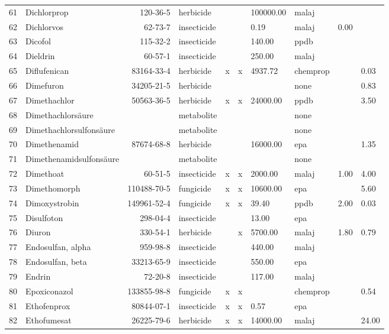 \begin{longtable}{lp{3cm}rlp{0.5cm}p{0.5cm}p{1cm}p{1cm}p{1cm}p{1cm}}
  61 & Dichlorprop & 120-36-5 & herbicide &  &  & 100000.00 & malaj &  &  \\ 
  62 & Dichlorvos & 62-73-7 & insecticide &  &  & 0.19 & malaj & 0.00 &  \\ 
  63 & Dicofol & 115-32-2 & insecticide &  &  & 140.00 & ppdb &  &  \\ 
  64 & Dieldrin & 60-57-1 & insecticide &  &  & 250.00 & malaj &  &  \\ 
  65 & Diflufenican & 83164-33-4 & herbicide & x & x & 4937.72 & chemprop &  & 0.03 \\ 
  66 & Dimefuron & 34205-21-5 & herbicide &  &  &  & none &  & 0.83 \\ 
  67 & Dimethachlor & 50563-36-5 & herbicide & x & x & 24000.00 & ppdb &  & 3.50 \\ 
  68 & Dimethachlorsäure &  & metabolite &  &  &  & none &  &  \\ 
  69 & Dimethachlorsulfonsäure &  & metabolite &  &  &  & none &  &  \\ 
  70 & Dimethenamid & 87674-68-8 & herbicide &  &  & 16000.00 & epa &  & 1.35 \\ 
  71 & Dimethenamidsulfonsäure &  & metabolite &  &  &  & none &  &  \\ 
  72 & Dimethoat & 60-51-5 & insecticide & x & x & 2000.00 & malaj & 1.00 & 4.00 \\ 
  73 & Dimethomorph & 110488-70-5 & fungicide & x & x & 10600.00 & epa &  & 5.60 \\ 
  74 & Dimoxystrobin & 149961-52-4 & fungicide & x & x & 39.40 & ppdb & 2.00 & 0.03 \\ 
  75 & Disulfoton & 298-04-4 & insecticide &  &  & 13.00 & epa &  &  \\ 
  76 & Diuron & 330-54-1 & herbicide &  & x & 5700.00 & malaj & 1.80 & 0.79 \\ 
  77 & Endosulfan, alpha & 959-98-8 & insecticide &  &  & 440.00 & malaj &  &  \\ 
  78 & Endosulfan, beta & 33213-65-9 & insecticide &  &  & 550.00 & epa &  &  \\ 
  79 & Endrin & 72-20-8 & insecticide &  &  & 117.00 & malaj &  &  \\ 
  80 & Epoxiconazol & 133855-98-8 & fungicide & x & x &  & chemprop &  & 0.54 \\ 
  81 & Ethofenprox & 80844-07-1 & insecticide & x & x & 0.57 & epa &  &  \\ 
  82 & Ethofumesat & 26225-79-6 & herbicide & x & x & 14000.00 & malaj &  & 24.00 \\ 

\end{longtable}
